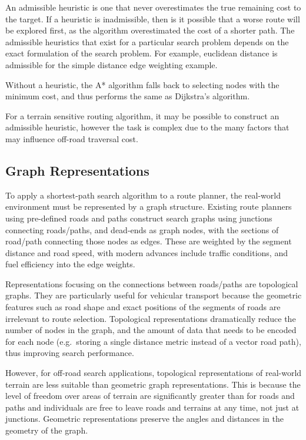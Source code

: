 \documentclass[12pt]{article}
\begin{document}
An admissible heuristic is one that never overestimates the true remaining cost to the target. If a heuristic is inadmissible, then is it possible that a worse route will be explored first, as the algorithm overestimated the cost of a shorter path. The admissible heuristics that exist for a particular search problem depends on the exact formulation of the search problem. For example, euclidean distance is admissible for the simple distance edge weighting example.

Without a heuristic, the A* algorithm falls back to selecting nodes with the minimum cost, and thus performs the same as Dijkstra's algorithm.

For a terrain sensitive routing algorithm, it may be possible to construct an admissible heuristic, however the task is complex due to the many factors that may influence off-road traversal cost.

\subsection{Graph Representations}

To apply a shortest-path search algorithm to a route planner, the real-world environment must be represented by a graph structure. Existing route planners using pre-defined roads and paths construct search graphs using junctions connecting roads/paths, and dead-ends as graph nodes, with the sections of road/path connecting those nodes as edges. These are weighted by the segment distance and road speed, with modern advances include traffic conditions, and fuel efficiency into the edge weights.

Representations focusing on the connections between roads/paths are topological graphs. They are particularly useful for vehicular transport because the geometric features such as road shape and exact positions of the segments of roads are irrelevant to route selection. Topological representations dramatically reduce the number of nodes in the graph, and the amount of data that needs to be encoded for each node (e.g.\ storing a single distance metric instead of a vector road path), thus improving search performance.

However, for off-road search applications, topological representations of real-world terrain are less suitable than geometric graph representations. This is because the level of freedom over areas of terrain are significantly greater than for roads and paths and individuals are free to leave roads and terrains at any time, not just at junctions. Geometric representations preserve the angles and distances in the geometry of the graph.
\end{document}
